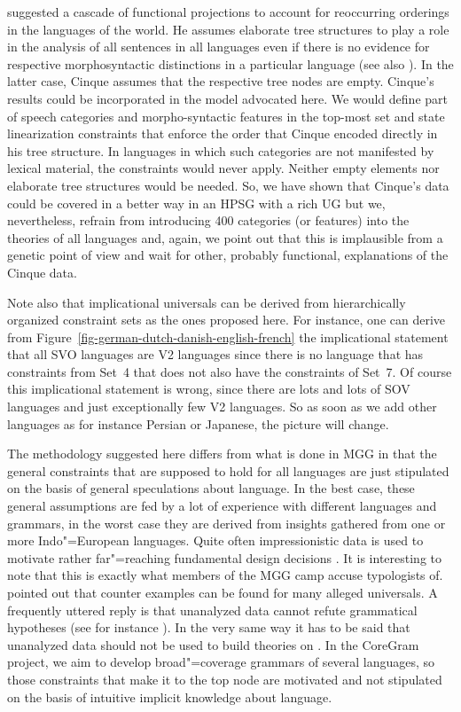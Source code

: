  suggested a cascade of functional projections to account for
reoccurring orderings in the languages of the world. He assumes elaborate tree structures to play a
role in the analysis of all sentences in all languages even if there is no evidence for respective
morphosyntactic distinctions in a particular language (see also \citealp[]{CR2010a}). In the
latter case, Cinque assumes that the respective tree nodes are empty. Cinque's results could be
incorporated in the model advocated here. We would define part of speech categories and
morpho-syntactic features in the top-most set and state linearization constraints that enforce the
order that Cinque encoded directly in his tree structure. In languages in which such categories are
not manifested by lexical material, the constraints would never apply. Neither empty elements nor
elaborate tree structures would be needed. So, we have shown that Cinque's data could be
covered in a better way in an HPSG with a rich UG but we, nevertheless, refrain from introducing 400 categories (or
features) into the theories of all languages and, again, we point out that this is implausible from a
genetic point of view and wait for other, probably functional, explanations of the Cinque data.

Note also that implicational universals can be derived from hierarchically organized constraint sets
as the ones proposed here. For instance, one
can derive from Figure~\ref{fig-german-dutch-danish-english-french} the implicational statement that
all SVO languages are V2 languages since there is no language that has constraints from Set~4 that
does not also have the constraints of Set~7. Of course this implicational statement is wrong, since there are
lots and lots of SOV languages and just exceptionally few V2 languages. So as soon as we add other
languages as for instance Persian or Japanese, the picture will change.

The methodology suggested here differs from what is done in MGG in that the general constraints that
are supposed to hold for all languages are just stipulated on the basis of general speculations
about language. In the best case, these general assumptions are fed by a lot of experience with
different languages and grammars, in the worst case they are derived from insights gathered
from one or more Indo"=European languages. Quite often impressionistic data is used to motivate
rather far"=reaching fundamental design decisions \citep{Fanselow2009a,SR2012a,Haider2016a}. It is interesting to note
that this is exactly what members of the MGG camp accuse typologists of. \citet{EL2009a} pointed out
that counter examples can be found for many alleged universals. A frequently uttered reply is that
unanalyzed data cannot refute grammatical hypotheses (see for instance \citealp[]{Freidin2009a}). In the very same way it has to be said that unanalyzed data
should not be used to build theories on \citep{Fanselow2009a}. In the CoreGram project, we aim to develop broad"=coverage
grammars of several languages, so those constraints that make it to the top node are motivated and
not stipulated on the basis of intuitive implicit knowledge about language.

